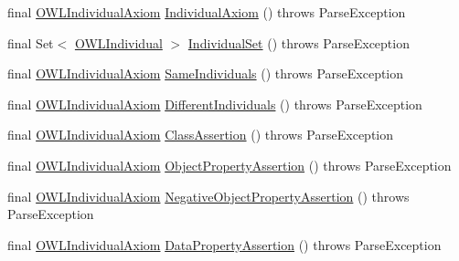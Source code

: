 \begin{DoxyCompactItemize}
\item 
final \hyperlink{interfaceorg_1_1semanticweb_1_1owlapi_1_1model_1_1_o_w_l_individual_axiom}{O\-W\-L\-Individual\-Axiom} \hyperlink{classorg_1_1coode_1_1owlapi_1_1functionalparser_1_1_o_w_l_functional_syntax_parser_a1189a5a4d555703a9970b5486e69b1a0}{Individual\-Axiom} ()  throws Parse\-Exception 
\item 
final Set$<$ \hyperlink{interfaceorg_1_1semanticweb_1_1owlapi_1_1model_1_1_o_w_l_individual}{O\-W\-L\-Individual} $>$ \hyperlink{classorg_1_1coode_1_1owlapi_1_1functionalparser_1_1_o_w_l_functional_syntax_parser_a96fd61e818b45ed1f3ead1f772facacf}{Individual\-Set} ()  throws Parse\-Exception 
\item 
final \hyperlink{interfaceorg_1_1semanticweb_1_1owlapi_1_1model_1_1_o_w_l_individual_axiom}{O\-W\-L\-Individual\-Axiom} \hyperlink{classorg_1_1coode_1_1owlapi_1_1functionalparser_1_1_o_w_l_functional_syntax_parser_a1e4c23e08f77baa1025ce49c9e922962}{Same\-Individuals} ()  throws Parse\-Exception 
\item 
final \hyperlink{interfaceorg_1_1semanticweb_1_1owlapi_1_1model_1_1_o_w_l_individual_axiom}{O\-W\-L\-Individual\-Axiom} \hyperlink{classorg_1_1coode_1_1owlapi_1_1functionalparser_1_1_o_w_l_functional_syntax_parser_abcf58ad7cea82e64b8853a8ff982e751}{Different\-Individuals} ()  throws Parse\-Exception 
\item 
final \hyperlink{interfaceorg_1_1semanticweb_1_1owlapi_1_1model_1_1_o_w_l_individual_axiom}{O\-W\-L\-Individual\-Axiom} \hyperlink{classorg_1_1coode_1_1owlapi_1_1functionalparser_1_1_o_w_l_functional_syntax_parser_a2b2fccd304f2b6deb9bdd0c02a21785c}{Class\-Assertion} ()  throws Parse\-Exception 
\item 
final \hyperlink{interfaceorg_1_1semanticweb_1_1owlapi_1_1model_1_1_o_w_l_individual_axiom}{O\-W\-L\-Individual\-Axiom} \hyperlink{classorg_1_1coode_1_1owlapi_1_1functionalparser_1_1_o_w_l_functional_syntax_parser_a9394a5e512afa35dca31683b1c1c43e1}{Object\-Property\-Assertion} ()  throws Parse\-Exception 
\item 
final \hyperlink{interfaceorg_1_1semanticweb_1_1owlapi_1_1model_1_1_o_w_l_individual_axiom}{O\-W\-L\-Individual\-Axiom} \hyperlink{classorg_1_1coode_1_1owlapi_1_1functionalparser_1_1_o_w_l_functional_syntax_parser_ad28efcb4d9b1182c8dc1041a7d87d038}{Negative\-Object\-Property\-Assertion} ()  throws Parse\-Exception 
\item 
final \hyperlink{interfaceorg_1_1semanticweb_1_1owlapi_1_1model_1_1_o_w_l_individual_axiom}{O\-W\-L\-Individual\-Axiom} \hyperlink{classorg_1_1coode_1_1owlapi_1_1functionalparser_1_1_o_w_l_functional_syntax_parser_af63279fe20a844fff4d13eb5af711af6}{Data\-Property\-Assertion} ()  throws Parse\-Exception 

\end{DoxyCompactItemize}

